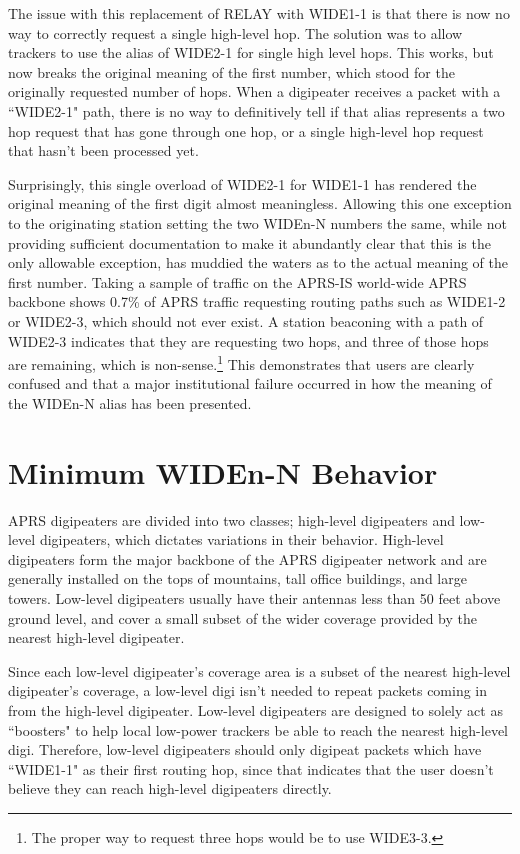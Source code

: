 The issue with this replacement of RELAY with WIDE1-1 is that there is now
no way to correctly request a single high-level hop.
The solution was to allow trackers to use the alias of WIDE2-1 for single
high level hops.
This works, but now breaks the original meaning of the first number,
which stood for the originally requested number of hops.
When a digipeater receives a packet with a ``WIDE2-1" path, 
there is no way to definitively
tell if that alias represents a two hop request that has gone through one hop,
or a single high-level hop request that hasn't been processed yet.

Surprisingly, this single overload of WIDE2-1 for WIDE1-1 has rendered the
original meaning of the first digit almost meaningless.
Allowing this one exception to the originating station setting the two WIDEn-N
numbers the same, while not providing sufficient documentation
to make it abundantly clear that this is the only allowable exception,
has muddied the waters as to the actual meaning of the first number.
Taking a sample of traffic on the APRS-IS world-wide APRS backbone shows
0.7\% of APRS traffic requesting routing paths such as WIDE1-2 or WIDE2-3,
which should not ever exist.
A station beaconing with a path of WIDE2-3 indicates that they are requesting
two hops, and three of those hops are remaining, which is non-sense.\footnote{The
proper way to request three hops would be to use WIDE3-3.}
This demonstrates that users are clearly confused and that a
major institutional failure occurred in how the meaning of the WIDEn-N alias has
been presented.

\section{Minimum WIDEn-N Behavior}

APRS digipeaters are divided into two classes; high-level digipeaters and
low-level digipeaters, which dictates variations in their behavior.
High-level digipeaters form the major backbone of the APRS digipeater network
and are generally installed on the tops of mountains,
tall office buildings, and large towers.
Low-level digipeaters usually have their antennas less than 50 feet above ground
level, and cover a small subset of the wider coverage provided by the
nearest high-level digipeater.

Since each low-level digipeater's coverage area is a subset of the
nearest high-level digipeater's coverage, a low-level digi isn't needed
to repeat packets coming in from the high-level digipeater.
Low-level digipeaters are designed to solely act as ``boosters" to
help local low-power trackers be able to reach the nearest high-level digi.
Therefore, low-level digipeaters should only digipeat packets which
have ``WIDE1-1" as their first routing hop, since that indicates that
the user doesn't believe they can reach high-level digipeaters directly.

